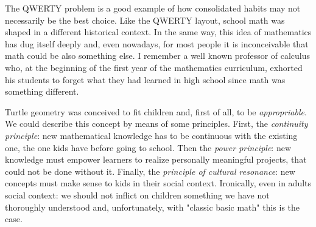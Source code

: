 The QWERTY problem is a good example of how consolidated habits may not necessarily be the best choice. Like the QWERTY layout, school math was shaped in a different historical context. In the same way, this idea of mathematics has dug itself deeply and, even nowadays, for most people it is inconceivable that math could be also something else. I remember a well known professor of calculus who, at the beginning of the first year of the mathematics curriculum, exhorted his students to forget what they had learned in high school since math was something different. 

Turtle geometry was conceived to fit children and, first of all, to be \textit{appropriable}. We could describe this concept by means of some principles. First, the \textit{continuity principle}: new mathematical knowledge has to be continuous with the existing one, the one kids have before going to school. Then the \textit{power principle}: new knowledge must empower learners to realize personally meaningful projects, that could not be done without it. Finally, the \textit{principle of cultural resonance}: new concepts must make sense to kids in their social context. Ironically, even in adults social context: we should not inflict on children something we have not thoroughly understood and, unfortunately, with "classic basic math" this is the case. 


